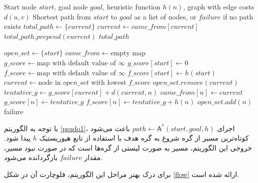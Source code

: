 \begin{latin}
	\begin{algorithm}
    \caption{$\mathsf{A}^{\!*}$ Pathfinding Algorithm}
		\label{psudo1}
		\begin{algorithmic}[1]
			\Require Start node $start$, goal node $goal$, heuristic function $h(n)$, graph with edge costs $d(u,v)$
			\Ensure Shortest path from $start$ to $goal$ as a list of nodes, or $failure$ if no path exists
			\State $total\_path \gets \{current\}$
			\State $current \gets came\_from[current]$
			\State $total\_path.prepend(current)$
			\EndWhile
			\State \Return $total\_path$
			\EndFunction
			
			\State $open\_set \gets \{start\}$
			\State $came\_from \gets \text{empty map}$
			\State $g\_score \gets \text{map with default value of } \infty$
			\State $g\_score[start] \gets 0$
			\State $f\_score \gets \text{map with default value of } \infty$
			\State $f\_score[start] \gets h(start)$
			\State $current \gets \text{node in } open\_set \text{ with lowest } f\_score$
			\State \Return {}
			\EndIf
			\State $open\_set.remove(current)$
			\State $tentative\_g \gets g\_score[current] + d(current, n)$
			\State $came\_from[n] \gets current$
			\State $g\_score[n] \gets tentative\_g$
			\State $f\_score[n] \gets tentative\_g + h(n)$
			\State $open\_set.add(n)$
			\EndIf
			\EndIf
			\EndFor
			\EndWhile
			\State \Return failure
			\EndFunction
			
		\end{algorithmic}
	\end{algorithm}
\end{latin}

\newpage
با توجه به الگوریتم \ref{psudo1}، اجرای $path \leftarrow \mathsf{A}^{\!*}(start, goal, h)$ باعث می‌شود کوتاه‌ترین مسیر از گره شروع به گره هدف با استفاده از تابع هیوریستیک $h$ پیدا شود. خروجی این الگوریتم، مسیر به صورت لیستی از گره‌ها است که در صورت نبود مسیر، مقدار $failure$ بازگردانده می‌شود.

برای درک بهتر مراحل این الگوریتم، فلوچارت آن در شکل   \ref{flow} ارائه شده است.

